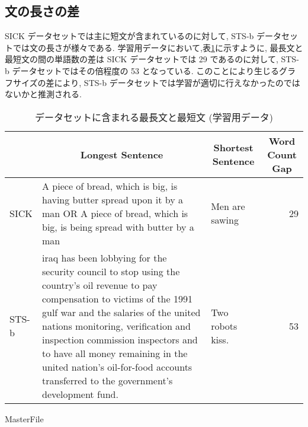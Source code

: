 \documentclass[a4j,twoside,12pt]{thesis} %
\begin{document}
\subsection{文の長さの差}
SICK データセットでは主に短文が含まれているのに対して, STS-b データセットでは文の長さが様々である.
学習用データにおいて,表\ref{table:len}に示すように, 最長文と最短文の間の単語数の差は SICK データセットでは 29 であるのに対して, STS-b データセットではその倍程度の 53 となっている.
このことにより生じるグラフサイズの差により, STS-b データセットでは学習が適切に行えなかったのではないかと推測される.
\begin{table}
  \caption{データセットに含まれる最長文と最短文 (学習用データ)}
  \label{table:len}
  \begin{center}
  \begin{tabularx}{\linewidth}{l||X|l|r}
    \hline
          & \multicolumn{1}{c|}{Longest Sentence} & \multicolumn{1}{c|}{Shortest Sentence} & \multicolumn{1}{c}{Word Count Gap} \\
    \hline
    \hline
    SICK &
    A piece of bread, which is big, is having butter spread upon it by a man OR A piece of bread, which is big, is being spread with butter by a man &
    Men are sawing &
    29 \\

    \hline
    STS-b &
    iraq has been lobbying for the security council to stop using the country's oil revenue to pay compensation to victims of the 1991 gulf war and the salaries of the united nations monitoring, verification and inspection commission inspectors and to have all money remaining in the united nation's oil-for-food accounts transferred to the government's development fund. &
    Two robots kiss. &
    53 \\
    \hline

  \end{tabularx}
  \end{center}
\end{table}

\expandafter\ifx\csname MasterFile\endcsname\relax
\def\MasterFile{本原稿です}

% 


\end{document}
